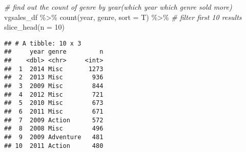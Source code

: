 \documentclass[
]{article}
\newenvironment{Shaded}{\begin{snugshade}}{\end{snugshade}}
\newcommand{\AttributeTok}[1]{\textcolor[rgb]{0.77,0.63,0.00}{#1}}
\newcommand{\CommentTok}[1]{\textcolor[rgb]{0.56,0.35,0.01}{\textit{#1}}}
\newcommand{\DecValTok}[1]{\textcolor[rgb]{0.00,0.00,0.81}{#1}}
\newcommand{\FunctionTok}[1]{\textcolor[rgb]{0.00,0.00,0.00}{#1}}
\newcommand{\NormalTok}[1]{#1}
\newcommand{\SpecialCharTok}[1]{\textcolor[rgb]{0.00,0.00,0.00}{#1}}
\begin{document}
\begin{Shaded}
\begin{Highlighting}[]
\CommentTok{\# find out the count of genre by year(which year which genre sold more)}
\NormalTok{vgsales\_df }\SpecialCharTok{\%\textgreater{}\%} 
  \FunctionTok{count}\NormalTok{(year, genre, }\AttributeTok{sort =}\NormalTok{ T) }\SpecialCharTok{\%\textgreater{}\%} 
  \CommentTok{\# filter first 10 results}
  \FunctionTok{slice\_head}\NormalTok{(}\AttributeTok{n =} \DecValTok{10}\NormalTok{)}
\end{Highlighting}
\end{Shaded}

\begin{verbatim}
## # A tibble: 10 x 3
##     year genre         n
##    <dbl> <chr>     <int>
##  1  2014 Misc       1273
##  2  2013 Misc        936
##  3  2009 Misc        844
##  4  2012 Misc        721
##  5  2010 Misc        673
##  6  2011 Misc        671
##  7  2009 Action      572
##  8  2008 Misc        496
##  9  2009 Adventure   481
## 10  2011 Action      480
\end{verbatim}
\end{document}
